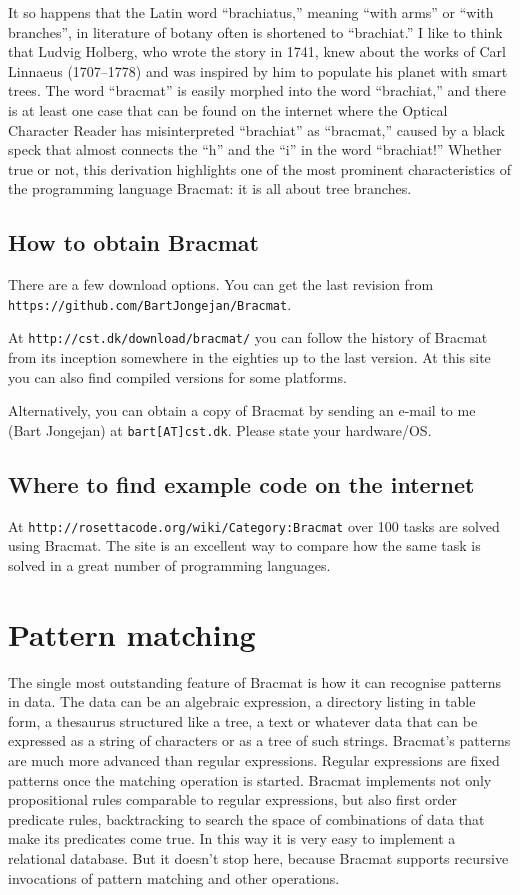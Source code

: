 \documentclass[12pt]{article}
\begin{document}
It so happens that the Latin word ``brachiatus,'' meaning ``with
arms'' or ``with branches'', in literature of botany often is
shortened to ``brachiat.'' I like to think that Ludvig Holberg, who
wrote the story in 1741, knew about the works of Carl Linnaeus
(1707--1778) and was inspired by him to populate his planet with smart
trees. The word ``bracmat'' is easily morphed into the word
``brachiat,'' and there is at least one case that can be found on the
internet where the Optical Character Reader has misinterpreted
``brachiat'' as ``bracmat,'' caused by a black speck that almost connects
the ``h'' and the ``i'' in the word ``brachiat!'' Whether true or not, this
derivation highlights one of the most prominent characteristics of the
programming language Bracmat: it is all about tree branches.

\subsection{How to obtain Bracmat}

There are a few download options. You can get the last revision from
\texttt{https://github.com/\allowbreak{}BartJongejan/\allowbreak{}Bracmat}.

At \texttt{http://cst.dk/download/bracmat/} you can follow the history
of Bracmat from its inception somewhere in the eighties up to the last
version. At this site you can also find compiled versions for some
platforms.

Alternatively, you can obtain a copy of Bracmat by sending an e-mail
to me (Bart Jongejan) at \texttt{bart[AT]cst.dk}. Please state your
hardware/OS.

\subsection{Where to find example code on the internet}

At \texttt{http://rosettacode.org/wiki/Category:Bracmat} over 100
tasks are solved using Bracmat. The site is an excellent way to
compare how the same task is solved in a great number of programming
languages.

\section{Pattern matching}

The single most outstanding feature of Bracmat is how it can recognise
patterns in data. The data can be an algebraic expression, a directory
listing in table form, a thesaurus structured like a tree, a text or
whatever data that can be expressed as a string of characters or as a
tree of such strings. Bracmat's patterns are much more advanced than
regular expressions. Regular expressions are fixed patterns once the
matching operation is started. Bracmat implements not only
propositional rules comparable to regular expressions, but also first
order predicate rules, backtracking to search the space of
combinations of data that make its predicates come true. In this way
it is very easy to implement a relational database. But it doesn't
stop here, because Bracmat supports recursive invocations of pattern
matching and other operations.
\end{document}
